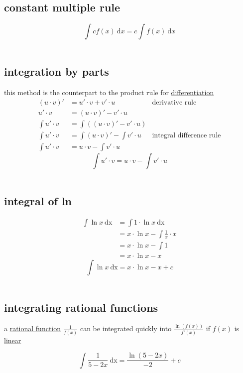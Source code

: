 \documentclass[a4paper,12pt]{article}
\newcommand\dif[1]{\:\textrm{d}#1}
\newcommand{\?}{\stackrel{?}{=}}
\begin{document}
\subsection{constant multiple rule}
\label{sec:org13700bd}
\[
  \int cf(x) \dif{x} = c\int f(x) \dif{x}
\]\\[0pt]
\subsection{integration by parts}
\label{sec:org97eb449}
this method is the counterpart to the product rule for \hyperref[sec:org5154d31]{differentiation}\\[0pt]
\begin{align*}
  (u \cdot v)' &= u' \cdot v + v' \cdot u & \text{derivative rule}\\
  u' \cdot v &= (u \cdot v)' - v' \cdot u\\
  \int u' \cdot v &= \int((u \cdot v)' - v' \cdot u)\\
  \int u' \cdot v &= \int{(u \cdot v)'} - \int{v' \cdot u} & \text{integral difference rule}\\
  \int u' \cdot v &= u \cdot v - \int v' \cdot u
\end{align*}
\[
  \boxed{\int u' \cdot v = u \cdot v - \int v' \cdot u}
\]\\[0pt]
\subsection{integral of ln}
\label{sec:orgbc0d0a8}
\begin{align*}
  \int \ln x \ \mathrm{dx} &= \int 1 \cdot \ln x \ \mathrm{dx}\\
                           &= x \cdot \ln x - \int \frac1x \cdot x\\
                           &= x \cdot \ln x - \int 1\\
                           &= x \cdot \ln x - x
\end{align*}
\[
  \boxed{\int \ln x \ \mathrm{dx} = x \cdot \ln x - x + c}
\]\\[0pt]
\subsection{integrating rational functions}
\label{sec:orgab53d10}
a \hyperref[sec:org1945d51]{rational function} \(\frac{1}{f(x)}\) can be integrated quickly into \(\frac{\ln(f(x))}{f'(x)}\) if \(f(x)\) is \hyperref[sec:org9ff23ea]{linear}\\[0pt]
\begin{my_example}
\[
  \int \frac{1}{5-2x} \ \mathrm{dx} = \frac{\ln(5-2x)}{-2} + c
\]\\[0pt]
\end{my_example}
\end{document}
